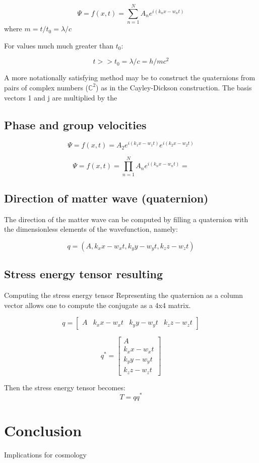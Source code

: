 \documentclass{article}
\begin{document}
$$\Psi=f(x,t)=\sum_{n=1}^N{A_n e^{i(k_n x-w_n t)}}$$ 
where $m=t/t_0=\lambda /c $

For values much much greater than $t_0$:

$$t>>t_0=\lambda /c=h/mc^2$$


A more notationally satisfying method may be to construct the quaternions from pairs of complex numbers ($\mathbb{C}^2$) as in the Cayley-Dickson construction. The basis vectors 1 and j are multiplied by the 

\subsection{Phase and group velocities}

$$\Psi=f(x,t)=A_2 e^{i(k_1 x-w_1 t)}e^{i(k_2 x-w_2 t)}$$

$$\Psi=f(x,t)=\prod_{n=1}^N{A_n e^{i(k_n x-w_n t)}}=$$

\subsection{Direction of matter wave (quaternion)}
The direction of the matter wave can be computed by filling a quaternion with the dimensionless elements of the wavefunction, namely:

$$q=(A, k_x x-w_x t, k_y y-w_y t, k_z z-w_z t)$$
\subsection{Stress energy tensor resulting}
Computing the stress energy tensor
Representing the quaternion as a column vector allows one to compute the conjugate as a 4x4 matrix.

$$q=
\left[
\begin{matrix}
A&k_x x-w_x t&k_y y-w_y t&k_z z-w_z t
\end{matrix}
\right]
$$

$$q^*=
\left[
\begin{matrix}
A\\k_x x-w_x t\\k_y y-w_y t\\k_z z-w_z t
\end{matrix}
\right]
$$

Then the stress energy tensor becomes:
$$T=qq^*$$
\section{Conclusion}
Implications for cosmology
\end{document}
